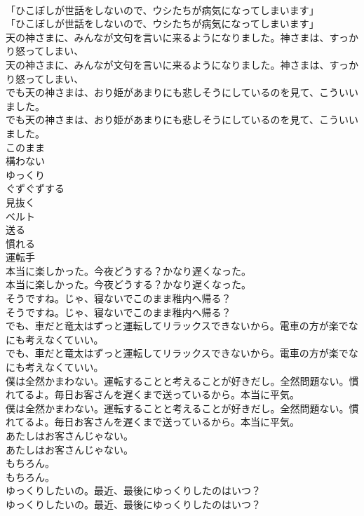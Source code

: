 \documentclass[8pt]{extreport}
\begin{document}
\begin{CJK}{UTF8}{min}
\\	「ひこぼしが世話をしないので、ウシたちが病気になってしまいます」	
\\	「ひこぼしが世話をしないので、ウシたちが病気になってしまいます」 
\\	天の神さまに、みんなが文句を言いに来るようになりました。神さまは、すっかり怒ってしまい、	
\\	天の神さまに、みんなが文句を言いに来るようになりました。神さまは、すっかり怒ってしまい、 
\\	でも天の神さまは、おり姫があまりにも悲しそうにしているのを見て、こういいました。	
\\	でも天の神さまは、おり姫があまりにも悲しそうにしているのを見て、こういいました。 
\\	このまま
\\	構わない
\\	ゆっくり
\\	ぐずぐずする
\\	見抜く
\\	ベルト
\\	送る
\\	慣れる
\\	運転手
\\	本当に楽しかった。今夜どうする？かなり遅くなった。	
\\	本当に楽しかった。今夜どうする？かなり遅くなった。 
\\	そうですね。じゃ、寝ないでこのまま稚内へ帰る？	
\\	そうですね。じゃ、寝ないでこのまま稚内へ帰る？ 
\\	でも、車だと竜太はずっと運転してリラックスできないから。電車の方が楽でなにも考えなくていい。	
\\	でも、車だと竜太はずっと運転してリラックスできないから。電車の方が楽でなにも考えなくていい。 
\\	僕は全然かまわない。運転することと考えることが好きだし。全然問題ない。慣れてるよ。毎日お客さんを遅くまで送っているから。本当に平気。	
\\	僕は全然かまわない。運転することと考えることが好きだし。全然問題ない。慣れてるよ。毎日お客さんを遅くまで送っているから。本当に平気。 
\\	あたしはお客さんじゃない。	
\\	あたしはお客さんじゃない。 
\\	もちろん。	
\\	もちろん。 
\\	ゆっくりしたいの。最近、最後にゆっくりしたのはいつ？	
\\	ゆっくりしたいの。最近、最後にゆっくりしたのはいつ？ 

\end{CJK}
\end{document}
